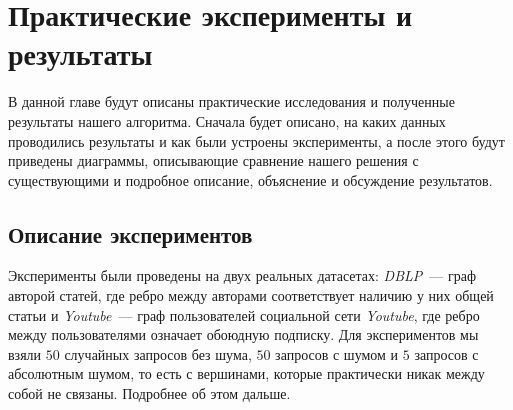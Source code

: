 \chapter{Практические эксперименты и результаты}

В данной главе будут описаны практические исследования и полученные результаты нашего алгоритма. Сначала будет описано, на каких данных проводились результаты и как были устроены эксперименты, а после этого будут приведены диаграммы, описывающие сравнение нашего решения с существующими и подробное описание, объяснение и обсуждение результатов.

\section{Описание экспериментов}

Эксперименты были проведены на двух реальных датасетах: \textit{DBLP}~--- граф авторой статей, где ребро между авторами соответствует наличию у них общей статьи и \textit{Youtube}~--- граф пользователей социальной сети \textit{Youtube}, где ребро между пользователями означает обоюдную подписку.
Для экспериментов мы взяли $50$ случайных запросов без шума, $50$ запросов с шумом и $5$ запросов с абсолютным шумом, то есть с вершинами, которые практически никак между собой не связаны. Подробнее об этом дальше.

